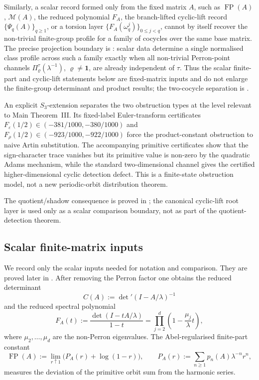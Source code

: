 \documentclass[11pt,a4paper]{amsart}
\theoremstyle{plain}
\theoremstyle{definition}
\theoremstyle{remark}
\DeclareMathOperator{\FP}{FP}
\begin{document}
Similarly, a scalar record formed only from the fixed matrix \(A\), such
as \(\FP(A)\), \(\mathcal M(A)\), the reduced polynomial \(F_A\), the
branch-lifted cyclic-lift record \(\{\Psi_q(A)\}_{q\ge1}\), or a torsion
layer \(\{F_A(\omega_q^j)\}_{0\le j<q}\), cannot by itself recover the
non-trivial finite-group profile for a family of cocycles over the same
base matrix. The precise projection boundary is
: scalar data determine
a single normalised class profile across such a family exactly when all
non-trivial Perron-point channels
\(\Pi_\varrho^\tau(\lambda^{-1})\), \(\varrho\neq\mathbf1\), are already
independent of \(\tau\). Thus the scalar finite-part and cyclic-lift
statements below are fixed-matrix inputs and do not enlarge the
finite-group determinant and product results; the two-cocycle separation is
.

An explicit \(S_3\)-extension separates the two obstruction types at the
level relevant to Main Theorem~III.  Its fixed-label Euler-transform
certificates
\(F_\varepsilon(1/2)\in(-381/1000,-380/1000)\) and
\(F_\rho(1/2)\in(-923/1000,-922/1000)\) force the product-constant
obstruction to naive Artin substitution.  The accompanying primitive
certificates show that the sign-character trace vanishes but its primitive
value is non-zero by the quadratic Adams mechanism, while the standard
two-dimensional channel gives the certified higher-dimensional cyclic
detection defect. This is a finite-state obstruction model, not a new
periodic-orbit distribution theorem.

The quotient/shadow consequence is proved in
; the canonical cyclic-lift root layer is used only as a scalar comparison boundary, not as part of the quotient-detection theorem.

\subsection{Scalar finite-matrix inputs}

We record only the scalar inputs needed for notation and comparison.
They are proved later in . After removing the
Perron factor one obtains the reduced determinant
\[
  C(A):=\det\nolimits'(I-A/\lambda)^{-1}
\]
and the reduced spectral polynomial
\[
  F_A(t):=\frac{\det(I-tA/\lambda)}{1-t}
  =\prod_{j=2}^d\left(1-\frac{\mu_j}{\lambda}t\right),
\]
where \(\mu_2,\dots,\mu_d\) are the non-Perron eigenvalues. The
Abel-regularised finite-part constant
\[
  \FP(A):=\lim_{r\uparrow 1}\bigl(P_A(r)+\log(1-r)\bigr),
  \qquad
  P_A(r):=\sum_{n\ge 1}p_n(A)\lambda^{-n}r^n,
\]
measures the deviation of the primitive orbit sum from the harmonic
series.
\end{document}
